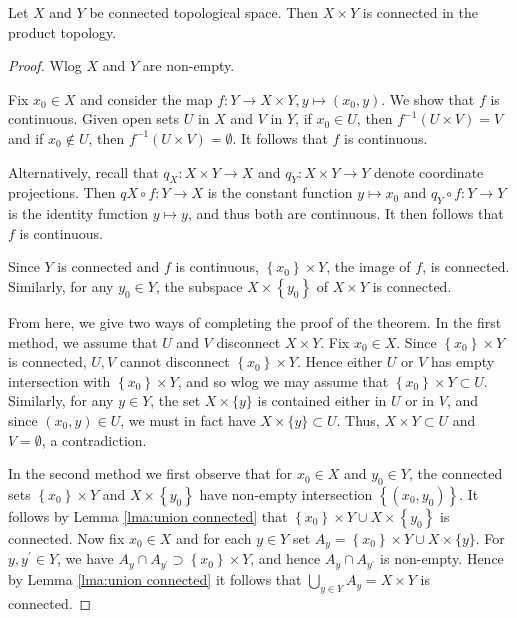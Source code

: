 \documentclass[a4paper]{article}
\begin{document}
\begin{theorem}\label{thm:product connected}
    Let $X$ and $Y$ be connected topological space. Then $X \times Y$ is connected in the product topology.
\end{theorem}
\begin{proof}
    Wlog $X$ and $Y$ are non-empty.

    Fix $x_{0} \in X$ and consider the map $f: Y \rightarrow X \times Y, y \mapsto\left(x_{0}, y\right)$. We show that $f$ is continuous. Given open sets $U$ in $X$ and $V$ in $Y$, if $x_{0} \in U$, then $f^{-1}(U \times V)=V$ and if $x_{0} \notin U$, then $f^{-1}(U \times V)=\emptyset$. It follows that $f$ is continuous.

    Alternatively, recall that $q_{X}: X \times Y \rightarrow X$ and $q_{Y}: X \times Y \rightarrow Y$ denote coordinate projections. Then $q X \circ f: Y \rightarrow X$ is the constant function $y \mapsto x_{0}$ and $q_{Y} \circ f: Y \rightarrow Y$ is the identity function $y \mapsto y$, and thus both are continuous. It then follows that $f$ is continuous.

    Since $Y$ is connected and $f$ is continuous, $\left\{x_{0}\right\} \times Y$, the image of $f$, is connected. Similarly, for any $y_{0} \in Y$, the subspace $X \times\left\{y_{0}\right\}$ of $X \times Y$ is connected.

    From here, we give two ways of completing the proof of the theorem. In the first method, we assume that $U$ and $V$ disconnect $X \times Y$. Fix $x_{0} \in X$. Since $\left\{x_{0}\right\} \times Y$ is connected, $U, V$ cannot disconnect $\left\{x_{0}\right\} \times Y$. Hence either $U$ or $V$ has empty intersection with $\left\{x_{0}\right\} \times Y$, and so wlog we may assume that $\left\{x_{0}\right\} \times Y \subset U$. Similarly, for any $y \in Y$, the set $X \times\{y\}$ is contained either in $U$ or in $V$, and since $\left(x_{0}, y\right) \in U$, we must in fact have $X \times\{y\} \subset U$. Thus, $X \times Y \subset U$ and $V=\emptyset$, a contradiction.

    In the second method we first observe that for $x_{0} \in X$ and $y_{0} \in Y$, the connected sets $\left\{x_{0}\right\} \times Y$ and $X \times\left\{y_{0}\right\}$ have non-empty intersection $\left\{\left(x_{0}, y_{0}\right)\right\}$. It follows by Lemma \ref{lma:union connected} that $\left\{x_{0}\right\} \times Y \cup X \times\left\{y_{0}\right\}$ is connected. Now fix $x_{0} \in X$ and for each $y \in Y$ set $A_{y}=\left\{x_{0}\right\} \times Y \cup X \times\{y\}$. For $y, y^{\prime} \in Y$, we have $A_{y} \cap A_{y^{\prime}} \supset\left\{x_{0}\right\} \times Y$, and hence $A_{y} \cap A_{y^{\prime}}$ is non-empty. Hence by Lemma \ref{lma:union connected} it follows that $\bigcup_{y \in Y} A_{y}=X \times Y$ is connected.
\end{proof}
\end{document}
